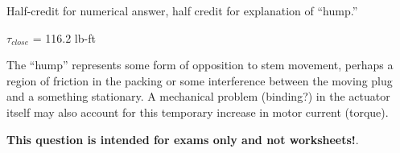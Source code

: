 





Half-credit for numerical answer, half credit for explanation of ``hump.''

\vskip 10pt

$\tau_{close}$ = 116.2 lb-ft

\vskip 10pt

The ``hump'' represents some form of opposition to stem movement, perhaps a region of friction in the packing or some interference between the moving plug and a something stationary.  A mechanical problem (binding?) in the actuator itself may also account for this temporary increase in motor current (torque).







{\bf This question is intended for exams only and not worksheets!}.



